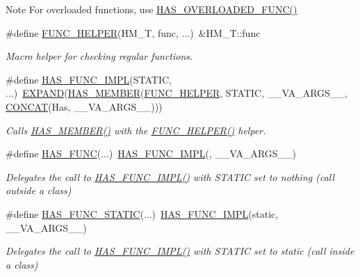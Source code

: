 \begin{DoxyNote}{Note}
For overloaded functions, use \hyperlink{group__HasMemberGroup_ga39d708fd02cbbba1ef5db4a5f46fe317}{H\+A\+S\+\_\+\+O\+V\+E\+R\+L\+O\+A\+D\+E\+D\+\_\+\+F\+U\+N\+C()} 
\end{DoxyNote}
\begin{DoxyCompactItemize}
\item 
\#define \hyperlink{group__HasMemberGroup_ga4ddaa42c162d5e18713602d14de20f7e}{F\+U\+N\+C\+\_\+\+H\+E\+L\+P\+ER}(H\+M\+\_\+T,  func, ...)~\&H\+M\+\_\+\+T\+::func
\begin{DoxyCompactList}\small\item\em Macro helper for checking regular functions. \end{DoxyCompactList}\item 
\#define \hyperlink{group__HasMemberGroup_ga7e88998dff3b091058161d39a8699d9f}{H\+A\+S\+\_\+\+F\+U\+N\+C\+\_\+\+I\+M\+PL}(S\+T\+A\+T\+IC, ...)~\hyperlink{ZipIter_2Helpers_8h_aa35fecfa6a93ec3fdb4a3776f873be27}{E\+X\+P\+A\+ND}(\hyperlink{group__HasMemberGroup_ga37993e5e75a0249077679e4776e89085}{H\+A\+S\+\_\+\+M\+E\+M\+B\+ER}(\hyperlink{group__HasMemberGroup_ga4ddaa42c162d5e18713602d14de20f7e}{F\+U\+N\+C\+\_\+\+H\+E\+L\+P\+ER}, S\+T\+A\+T\+IC, \+\_\+\+\_\+\+V\+A\+\_\+\+A\+R\+G\+S\+\_\+\+\_\+, \hyperlink{ZipIter_2Helpers_8h_a2f18db18bca26cafa95e9719de4a41ef}{C\+O\+N\+C\+AT}(Has, \+\_\+\+\_\+\+V\+A\+\_\+\+A\+R\+G\+S\+\_\+\+\_\+)))
\begin{DoxyCompactList}\small\item\em Calls \hyperlink{group__HasMemberGroup_ga37993e5e75a0249077679e4776e89085}{H\+A\+S\+\_\+\+M\+E\+M\+B\+E\+R()} with the \hyperlink{group__HasMemberGroup_ga4ddaa42c162d5e18713602d14de20f7e}{F\+U\+N\+C\+\_\+\+H\+E\+L\+P\+E\+R()} helper. \end{DoxyCompactList}\item 
\#define \hyperlink{group__HasMemberGroup_ga8387ada8a5ce075169e86b9c2817fdef}{H\+A\+S\+\_\+\+F\+U\+NC}(...)~\hyperlink{group__HasMemberGroup_ga7e88998dff3b091058161d39a8699d9f}{H\+A\+S\+\_\+\+F\+U\+N\+C\+\_\+\+I\+M\+PL}(, \+\_\+\+\_\+\+V\+A\+\_\+\+A\+R\+G\+S\+\_\+\+\_\+)
\begin{DoxyCompactList}\small\item\em Delegates the call to \hyperlink{group__HasMemberGroup_ga7e88998dff3b091058161d39a8699d9f}{H\+A\+S\+\_\+\+F\+U\+N\+C\+\_\+\+I\+M\+P\+L()} with {\ttfamily S\+T\+A\+T\+IC} set to nothing (call outside a class) \end{DoxyCompactList}\item 
\#define \hyperlink{group__HasMemberGroup_ga6376819e5b3bcbf0f42d4b6348125c52}{H\+A\+S\+\_\+\+F\+U\+N\+C\+\_\+\+S\+T\+A\+T\+IC}(...)~\hyperlink{group__HasMemberGroup_ga7e88998dff3b091058161d39a8699d9f}{H\+A\+S\+\_\+\+F\+U\+N\+C\+\_\+\+I\+M\+PL}(static, \+\_\+\+\_\+\+V\+A\+\_\+\+A\+R\+G\+S\+\_\+\+\_\+)
\begin{DoxyCompactList}\small\item\em Delegates the call to \hyperlink{group__HasMemberGroup_ga7e88998dff3b091058161d39a8699d9f}{H\+A\+S\+\_\+\+F\+U\+N\+C\+\_\+\+I\+M\+P\+L()} with {\ttfamily S\+T\+A\+T\+IC} set to {\ttfamily static} (call inside a class) \end{DoxyCompactList}\end{DoxyCompactItemize}
